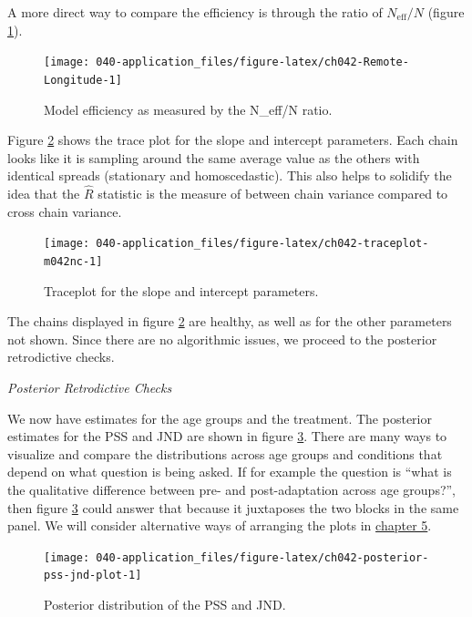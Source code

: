 \documentclass[11pt, oneside, openany]{scrbook}
\begin{document}
A more direct way to compare the efficiency is through the ratio of \(N_{\mathrm{eff}} / N\) (figure \ref{fig:ch042-Remote-Longitude}).

\begin{figure}

{\centering \texttt{[image: 040-application\_files/figure-latex/ch042-Remote-Longitude-1]} 

}

\caption{Model efficiency as measured by the N\_eff/N ratio.}\label{fig:ch042-Remote-Longitude}
\end{figure}

Figure \ref{fig:ch042-traceplot-m042nc} shows the trace plot for the slope and intercept parameters. Each chain looks like it is sampling around the same average value as the others with identical spreads (stationary and homoscedastic). This also helps to solidify the idea that the \(\hat{R}\) statistic is the measure of between chain variance compared to cross chain variance.

\begin{figure}

{\centering \texttt{[image: 040-application\_files/figure-latex/ch042-traceplot-m042nc-1]} 

}

\caption{Traceplot for the slope and intercept parameters.}\label{fig:ch042-traceplot-m042nc}
\end{figure}

The chains displayed in figure \ref{fig:ch042-traceplot-m042nc} are healthy, as well as for the other parameters not shown. Since there are no algorithmic issues, we proceed to the posterior retrodictive checks.

\emph{Posterior Retrodictive Checks}

We now have estimates for the age groups and the treatment. The posterior estimates for the PSS and JND are shown in figure \ref{fig:ch042-posterior-pss-jnd-plot}. There are many ways to visualize and compare the distributions across age groups and conditions that depend on what question is being asked. If for example the question is ``what is the qualitative difference between pre- and post-adaptation across age groups?'', then figure \ref{fig:ch042-posterior-pss-jnd-plot} could answer that because it juxtaposes the two blocks in the same panel. We will consider alternative ways of arranging the plots in \protect\hyperlink{results}{chapter 5}.

\begin{figure}

{\centering \texttt{[image: 040-application\_files/figure-latex/ch042-posterior-pss-jnd-plot-1]} 

}

\caption{Posterior distribution of the PSS and JND.}\label{fig:ch042-posterior-pss-jnd-plot}
\end{figure}
\end{document}
